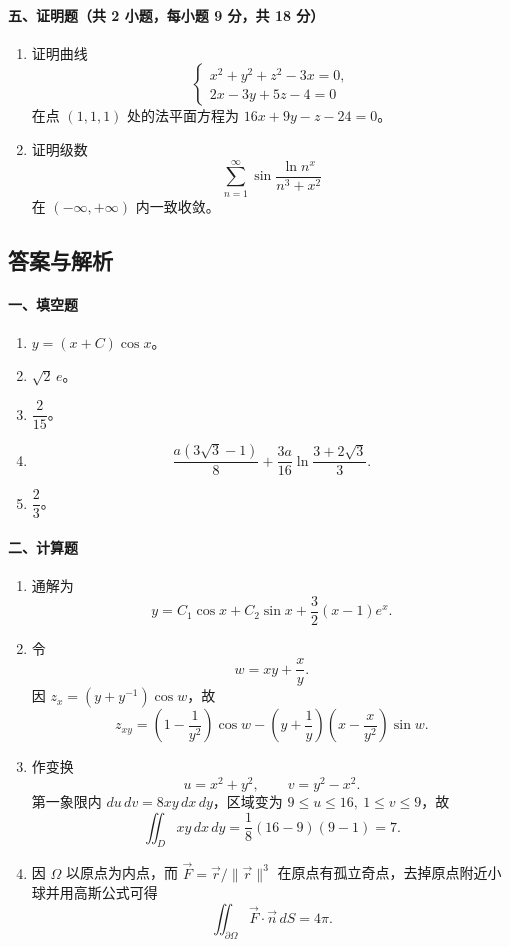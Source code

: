 \paragraph*{五、证明题（共 2 小题，每小题 9 分，共 18 分）}
\begin{enumerate}
  \item 证明曲线
  \[
    \begin{cases}
      x^2+y^2+z^2-3x=0,\\
      2x-3y+5z-4=0
    \end{cases}
  \]
  在点 $(1,1,1)$ 处的法平面方程为 $16x+9y-z-24=0$。
  \item 证明级数
  \[
    \sum_{n=1}^\infty \sin\frac{\ln n^x}{n^3+x^2}
  \]
  在 $(-\infty,+\infty)$ 内一致收敛。
\end{enumerate}

\subsection{答案与解析}

\paragraph*{一、填空题}
\begin{enumerate}
  \item $y=(x+C)\cos x$。
  \item $\sqrt2\,e$。
  \item $\dfrac{2}{15}$。
  \item
  \[
    \frac{a(3\sqrt3-1)}{8}
    +\frac{3a}{16}\ln\frac{3+2\sqrt3}{3}.
  \]
  \item $\dfrac23$。
\end{enumerate}

\paragraph*{二、计算题}
\begin{enumerate}
  \item 通解为
  \[
    y=C_1\cos x+C_2\sin x+\frac32(x-1)e^x.
  \]
  \item 令
  \[
    w=xy+\frac{x}{y}.
  \]
  因 $z_x=(y+y^{-1})\cos w$，故
  \[
    z_{xy}
    =\left(1-\frac1{y^2}\right)\cos w
    -\left(y+\frac1y\right)\left(x-\frac{x}{y^2}\right)\sin w.
  \]
  \item 作变换
  \[
    u=x^2+y^2,\qquad v=y^2-x^2.
  \]
  第一象限内 $du\,dv=8xy\,dx\,dy$，区域变为 $9\le u\le16,\ 1\le v\le9$，故
  \[
    \iint_D xy\,dx\,dy
    =\frac18(16-9)(9-1)=7.
  \]
  \item 因 $\Omega$ 以原点为内点，而 $\vec F=\vec r/\|\vec r\|^3$ 在原点有孤立奇点，去掉原点附近小球并用高斯公式可得
  \[
    \iint_{\partial\Omega}\vec F\cdot\vec n\,dS=4\pi.
  \]
\end{enumerate}

